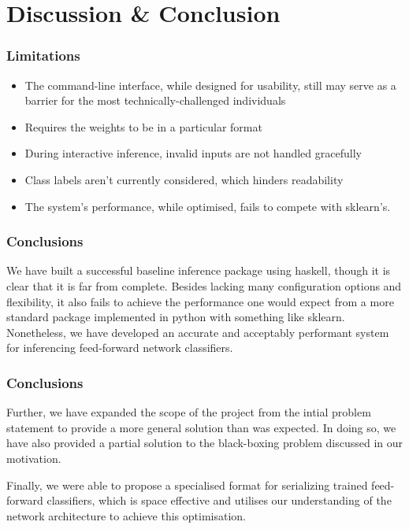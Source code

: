 \documentclass{beamer}
\begin{document}
\section{Discussion \& Conclusion}

\begin{frame}
  \frametitle{Limitations}
  \begin{itemize}
    \item The command-line interface, while designed for usability, still may serve as a barrier for the most technically-challenged individuals
    \item Requires the weights to be in a particular format
    \item During interactive inference, invalid inputs are not handled gracefully
    \item Class labels aren't currently considered, which hinders readability
    \item The system's performance, while optimised, fails to compete with sklearn's.
  \end{itemize}
\end{frame}

\begin{frame}
  \frametitle{Conclusions}
  We have built a successful baseline inference package using haskell, though it is clear that it is far from complete. Besides lacking many configuration options and flexibility, it also fails to achieve the performance one would expect from a more standard package implemented in python with something like sklearn. Nonetheless, we have developed an accurate and acceptably performant system for inferencing feed-forward network classifiers.
\end{frame}

\begin{frame}
  \frametitle{Conclusions}
  Further, we have expanded the scope of the project from the intial problem statement to provide a more general solution than was expected. In doing so, we have also provided a partial solution to the black-boxing problem discussed in our motivation.\bigskip

  Finally, we were able to propose a specialised format for serializing trained feed-forward classifiers, which is space effective and utilises our understanding of the network architecture to achieve this optimisation.
\end{frame}
\end{document}
